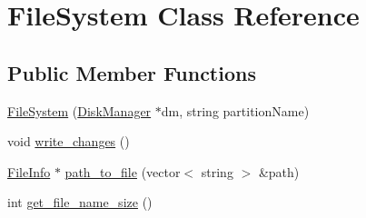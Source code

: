 \hypertarget{classFileSystem}{}\section{File\+System Class Reference}
\label{classFileSystem}
\subsection*{Public Member Functions}
\begin{DoxyCompactItemize}
\item 
\mbox{\hyperlink{classFileSystem_a1466c6d1e9636cecd44f0dd68ef710b5}{File\+System}} (\mbox{\hyperlink{classDiskManager}{Disk\+Manager}} $\ast$dm, string partition\+Name)
\item 
void \mbox{\hyperlink{classFileSystem_a02953b33b71137de70b8c8e48c59ff77}{write\+\_\+changes}} ()
\item 
\mbox{\hyperlink{classFileInfo}{File\+Info}} $\ast$ \mbox{\hyperlink{classFileSystem_a6c6e95f60417b02601b72e951e7108f8}{path\+\_\+to\+\_\+file}} (vector$<$ string $>$ \&path)
\item 
int \mbox{\hyperlink{classFileSystem_a0444400c1e30b7981123ba6991798c86}{get\+\_\+file\+\_\+name\+\_\+size}} ()
\end{DoxyCompactItemize}
